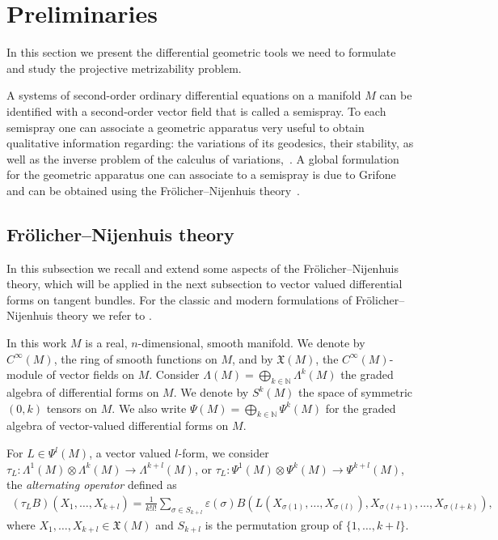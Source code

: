 \section{Preliminaries} \label{sec:prelim}

In this section we present the dif\/ferential geometric tools
we need to formulate and study the projective metrizability problem.

A systems of second-order ordinary dif\/ferential equations on a
manifold $M$ can be identif\/ied with a second-order vector f\/ield
that is called a semispray. To each semispray one can associate a
geometric apparatus very useful to obtain qualitative information
regarding: the variations of its geodesics, their stability, as
well as the inverse problem of the calculus of variations,~\cite{bcd10}.
A global formulation for the geometric apparatus one can associate
to a semispray is due to Grifone \cite{grifone72} and can be
obtained using the Fr\"olicher--Nijenhuis theo\-ry~\cite{frolicher56}.

\subsection[Fr\"olicher-Nijenhuis theory]{Fr\"olicher--Nijenhuis theory} \label{subsec:fn}

In this subsection we recall and extend some aspects of the
Fr\"olicher--Nijenhuis theory, which will be applied in the next
subsection to vector valued dif\/ferential forms on tangent bundles.
For the classic and modern formulations of Fr\"olicher--Nijenhuis theory we
refer to \cite{frolicher56, grifone72, grifone00, KMS93, deleon89}.

In this work $M$ is a real, $n$-dimensional, smooth manifold. We
denote by $C^{\infty}(M)$, the ring of smooth functions on $M$,
and by ${\mathfrak X}(M)$, the $C^{\infty}(M)$-module of vector
f\/ields on $M$. Consider $\Lambda(M)=\bigoplus_{k\in {\mathbb
N}}\Lambda^k(M)$ the graded algebra of dif\/ferential forms on $M$. We
denote by $S^k(M)$ the space of symmetric $(0,k)$ tensors on $M$.
We also write $\Psi(M)=\bigoplus_{k\in {\mathbb N}}\Psi^k(M)$ for the
graded algebra of vector-valued dif\/ferential forms on $M$.

For $L\in \Psi^l(M)$, a vector valued $l$-form, we consider
$\tau_L: \Lambda^1(M) \otimes \Lambda^k(M) \to \Lambda^{k+l}(M)$,
or $\tau_L: \Psi^1(M) \otimes \Psi^k(M) \to \Psi^{k+l}(M)$, the
\emph{alternating operator} def\/ined as
\begin{gather}
\label{taull}  (\tau_L B)(X_1,\dots ,X_{k+l}) = \frac{1}{k!l!} \sum_{\sigma \in S_{k+l}}
\varepsilon(\sigma) B(L(X_{\sigma(1)},\dots , X_{\sigma(l)}),
X_{\sigma(l+1)},\dots , X_{\sigma(l+k)}),
\end{gather}
where
$X_1,\dots , X_{k+l} \in {\mathfrak X}(M)$ and $S_{k+l}$ is the
permutation group of $\{1,\dots , k+l\}$.

